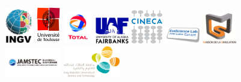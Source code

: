 \begin{figure}[htbp]
\begin{centering}
\includegraphics[width=0.109\textwidth]{figures/logo_INGV.jpg}\vspace*{2truemm}
\includegraphics[width=0.102\textwidth]{figures/logo_Univ_Toulouse.jpg}\vspace*{2truemm}
\includegraphics[width=0.112\textwidth]{figures/logo_TOTAL.jpg}\vspace*{2truemm}
\includegraphics[width=0.130\textwidth]{figures/logo_Fairbanks.jpg}\vspace*{2truemm}
\includegraphics[width=0.120\textwidth]{figures/logo_CINECA.jpg}\vspace*{2truemm}
\includegraphics[width=0.140\textwidth]{figures/logo_Intel_Exascale_Labs.png}\vspace*{2truemm}
\includegraphics[width=0.130\textwidth]{figures/logo_Maison_Simulation.jpg}\vspace*{2truemm}
\includegraphics[width=0.220\textwidth]{figures/logo_Jamstec.png}\vspace*{2truemm}
\includegraphics[width=0.220\textwidth]{figures/logo_Kaust.png}\vspace*{2truemm}
\par\end{centering}
\end{figure}

